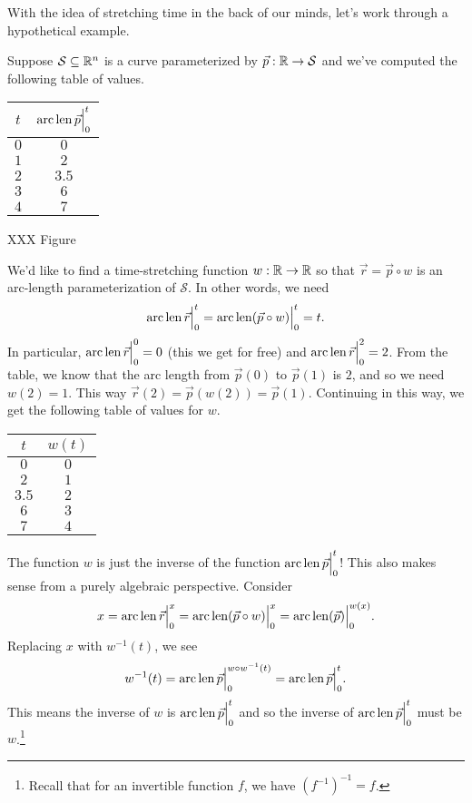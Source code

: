 With the idea of stretching time in the back of our minds, let's work through a hypothetical example.

Suppose $\mathcal S\subseteq \mathbb{R}^n$ is a curve parameterized by $\vec p:\mathbb{R}\to\mathcal S$ and we've computed
the following table of values.
\begin{center}
	\begin{tabular}{c|c}
		$t$ & $\operatorname{arc\,len} \vec p \Big|_{0}^{t}$\\
		\hline
		$0$ & $0$\\
		$1$ & $2$\\
		$2$ & $3.5$\\
		$3$ & $6$\\
		$4$ & $7$
	\end{tabular}
\end{center}

XXX Figure

We'd like to find a time-stretching function $w:\mathbb{R}\to\mathbb{R}$ so that $\vec r=\vec p\circ w$ is an arc-length
parameterization of $\mathcal S$.  In other words, we need
\[
	\operatorname{arc\,len} \vec r \Big|_{0}^{t} = \operatorname{arc\,len} (\vec p\circ w) \Big|_{0}^{t}=t.
\]
In particular, $\operatorname{arc\,len} \vec r \Big|_{0}^{0}=0$ (this we get for free) and $\operatorname{arc\,len} \vec r \Big|_{0}^{2}=2$.
From the table, we know that the arc length from $\vec p(0)$ to $\vec p(1)$ is $2$, and so we need
$w(2) =1$.  This way $\vec r(2) = \vec p(w (2)) = \vec p(1)$.  Continuing in this way, we get the following
table of values for $w$.
\begin{center}
	\begin{tabular}{c|c}
		$t$ & $w(t)$\\
		\hline
		$0$ & $0$\\
		$2$ & $1$\\
		$3.5$ & $2$\\
		$6$ & $3$\\
		$7$ & $4$
	\end{tabular}
\end{center}

The function $w$ is just the inverse of the function $\operatorname{arc\,len} \vec p \Big|_{0}^{t}$!  This also makes sense
from a purely algebraic perspective.  Consider
\[
	x=\operatorname{arc\,len} \vec r \Big|_{0}^{x} = \operatorname{arc\,len} (\vec p\circ w) \Big|_{0}^{x}=\operatorname{arc\,len} (\vec p) \Big|_{0}^{w(x)}.
\]
Replacing $x$ with $w^{-1}(t)$, we see
\[
	w^{-1}(t) = \operatorname{arc\,len} \vec p \Big|_{0}^{w\circ w^{-1}(t)} = \operatorname{arc\,len} \vec p \Big|_{0}^{t}.
\]
This means the inverse of $w$ is $\operatorname{arc\,len} \vec p \Big|_{0}^{t}$ and so the inverse of $\operatorname{arc\,len} \vec p \Big|_{0}^{t}$
must be $w$.\footnote{ Recall that for an invertible function $f$, we have $(f^{-1})^{-1}=f$.}

